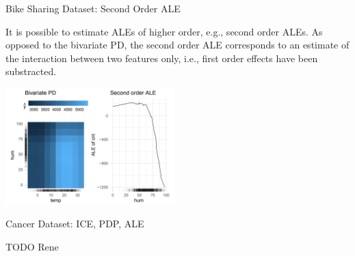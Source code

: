 \documentclass[aspectratio=169]{../latex_main/tntbeamer}  %
\begin{document}

\begin{frame}{Bike Sharing Dataset: Second Order ALE}

It is possible to estimate ALEs of higher order, e.g., second order ALEs. As opposed to the bivariate PD, the second order ALE corresponds to an estimate of the interaction between two features only, i.e., first order effects have been substracted.

\vspace{0.1cm}

\begin{center}
\includegraphics[width=0.49\textwidth]{figure/second-order.png}
\end{center}

\end{frame}



\begin{frame}{Cancer Dataset: ICE, PDP, ALE}

TODO Rene

\end{frame}


	
\end{document}
